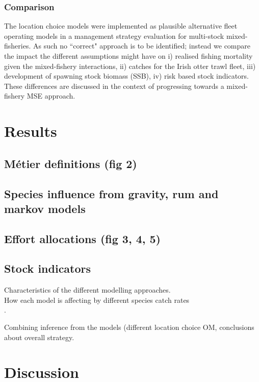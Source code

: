 \documentclass[12pt, halfline, a4paper]{ouparticle}
\begin{document}
\subsubsection{Comparison}

The location choice models were implemented as plausible alternative fleet
operating models in a management strategy evaluation for multi-stock
mixed-fisheries. As such no ``correct" approach is to be identified; instead we
compare the impact the different assumptions might have on i) realised fishing
mortality given the mixed-fishery interactions, ii) catches for the Irish otter
trawl fleet, iii) development of spawning stock biomass (SSB), iv) risk based
stock indicators. These differences are discussed in the context of progressing
towards a mixed-fishery MSE approach.

\section{Results}
\label{res}

\subsection{Métier definitions (fig 2)}

\subsection{Species influence from gravity, rum and markov models}

\subsection{Effort allocations (fig 3, 4, 5)}

\subsection{Stock indicators}

Characteristics of the different modelling approaches. \\

How each model is affecting by different species catch rates \\.

Combining inference from the models (different location choice OM, conclusions
about overall strategy. \\


\section{Discussion}
\label{dis}
\end{document}
